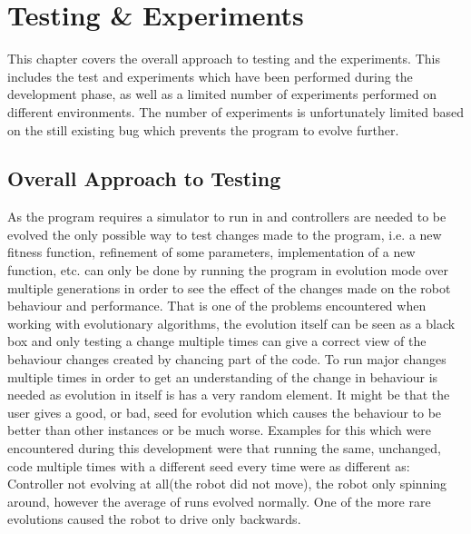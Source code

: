 \chapter{Testing \& Experiments}
This chapter covers the overall approach to testing and the experiments. 
This includes the test and experiments which have been performed during the development phase, as well as a limited number of experiments performed on different environments. 
The number of experiments is unfortunately limited based on the still existing bug which prevents the program to evolve further. 

\section{Overall Approach to Testing}
As the program requires a simulator to run in and controllers are needed to be evolved the only possible way to test changes made to the program, i.e. a new fitness function, refinement of some parameters, implementation of a new function, etc. can only be done by running the program in evolution mode over multiple generations in order to see the effect of the changes made on the robot behaviour and performance.
That is one of the problems encountered when working with evolutionary algorithms, the evolution itself can be seen as a black box and only testing a change multiple times can give a correct view of the behaviour changes created by chancing part of the code. To run major changes multiple times in order to get an understanding of the change in behaviour is needed as evolution in itself is has a very random element.
It might be that the user gives a good, or bad, seed for evolution which causes the behaviour to be better than other instances or be much worse. 
Examples for this which were encountered during this development were that running the same, unchanged, code multiple times with a different seed every time were as different as: Controller not evolving at all(the robot did not move), the robot only spinning around, however the average of runs evolved normally. 
One of the more rare evolutions caused the robot to drive only backwards. \\

